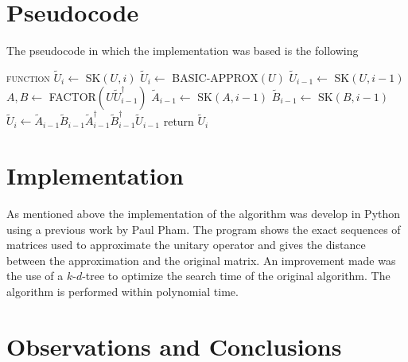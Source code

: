 \documentclass[a0,portrait]{a0poster}
\begin{document}
\begin{multicols}{2}

\color{SaddleBrown}

\section*{Pseudocode}
The pseudocode in which the implementation was based is the following

\begin{minipage}{50cm}
\begin{algorithmic}[1]
	\STATE \textsc{function} $\tilde{U}_i \leftarrow$ SK$(U,i)$
	\STATE $\tilde{U}_i \leftarrow $ BASIC-APPROX$(U)$
	\ELSE
	\STATE $\tilde{U}_{i-1} \leftarrow$ SK$(U, i-1)$
	\STATE $A,B \leftarrow $ FACTOR$(U\tilde{U}^\dagger_{i-1})$
	\STATE $\tilde{A}_{i-1} \leftarrow $ SK$(A, i-1)$
	\STATE $\tilde{B}_{i-1} \leftarrow $ SK$(B, i-1)$
	\STATE $\tilde{U}_i \leftarrow \tilde{A}_{i-1}\tilde{B}_{i-1}\tilde{A}^\dagger_{i-1}\tilde{B}^\dagger_{i-1}\tilde{U}_{i-1}$
	\ENDIF
	\STATE return $\tilde{U}_i$
\end{algorithmic}
\centering
{}
\label{sk-code}
\end{minipage}



\color{SaddleBrown} %


\color{DarkSlateGray} %

\section*{Implementation}

As mentioned above the implementation of the algorithm was develop in Python using a previous work by Paul Pham. The program shows the exact sequences of matrices used to approximate the unitary operator and gives the distance between the approximation and the original matrix. An improvement made was the use of a $k$-$d$-tree to optimize the search time of the original algorithm. The algorithm is performed within polynomial time.   


\color{SaddleBrown}


\section*{Observations and Conclusions}


\end{multicols}
\end{document}
